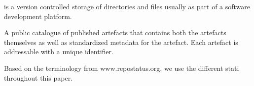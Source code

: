 \documentclass{article}
\begin{document}
\label{sb2fsk1enr1}
is a version controlled storage of directories and files usually as part of a software development platform.



\label{bu8qxagwu08b}
A public catalogue of published artefacts that contains both the artefacts themselves as well as standardized metadata for the artefact. Each artefact is addressable with a unique identifier. 



\label{msegj6m7qry}
Based on the terminology from www.repostatus.org, we use the different stati throughout this paper.



\printbibliography
\end{document}
